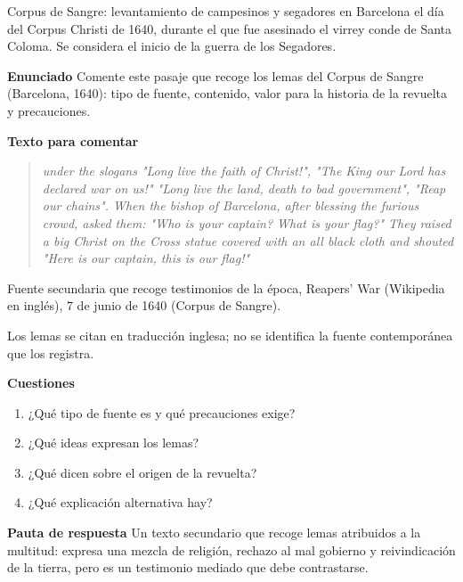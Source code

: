 \documentclass{book}
\begin{document}
\begin{tcolorbox}[title={Definición}, studiumdef, breakable]

Corpus de Sangre: levantamiento de campesinos y segadores en Barcelona el día del Corpus Christi de 1640, durante el que fue asesinado el virrey conde de Santa Coloma. Se considera el inicio de la guerra de los Segadores.

\end{tcolorbox}

\begin{tcolorbox}[title={Ejercicio resuelto}, studiumworked, breakable]

\noindent\textbf{Enunciado}
Comente este pasaje que recoge los lemas del Corpus de Sangre (Barcelona, 1640): tipo de fuente, contenido, valor para la historia de la revuelta y precauciones.


\noindent\textbf{Texto para comentar}

\begin{quote}
\itshape under the slogans "Long live the faith of Christ!", "The King our Lord has declared war on us!" "Long live the land, death to bad government", "Reap our chains". When the bishop of Barcelona, after blessing the furious crowd, asked them: "Who is your captain? What is your flag?" They raised a big Christ on the Cross statue covered with an all black cloth and shouted "Here is our captain, this is our flag!"
\end{quote}
{\noindent\footnotesize Fuente secundaria que recoge testimonios de la época, Reapers' War (Wikipedia en inglés), 7 de junio de 1640 (Corpus de Sangre).\par}
{\noindent\footnotesize Los lemas se citan en traducción inglesa; no se identifica la fuente contemporánea que los registra.\par}

\noindent\textbf{Cuestiones}
\begin{enumerate}
\item ¿Qué tipo de fuente es y qué precauciones exige?
\item ¿Qué ideas expresan los lemas?
\item ¿Qué dicen sobre el origen de la revuelta?
\item ¿Qué explicación alternativa hay?
\end{enumerate}

\noindent\textbf{Pauta de respuesta}
Un texto secundario que recoge lemas atribuidos a la multitud: expresa una mezcla de religión, rechazo al mal gobierno y reivindicación de la tierra, pero es un testimonio mediado que debe contrastarse.



\end{tcolorbox}
\end{document}
